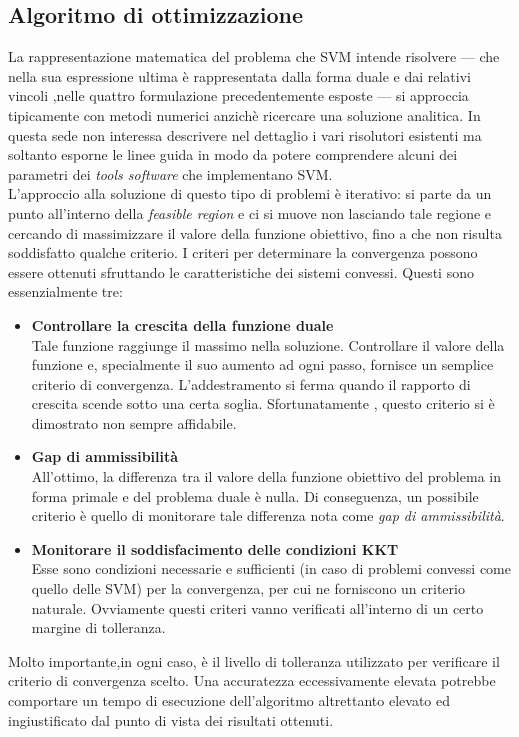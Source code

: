  \subsection{Algoritmo di ottimizzazione}
 La rappresentazione matematica del problema che \ac{SVM} intende risolvere --- che nella sua espressione ultima è rappresentata dalla forma duale e dai relativi vincoli ,nelle quattro formulazione precedentemente esposte  --- si approccia tipicamente con metodi numerici anzichè ricercare una soluzione analitica. In questa sede non interessa descrivere nel dettaglio i vari risolutori esistenti ma soltanto esporne le linee guida in modo da potere comprendere alcuni dei parametri dei \textit{tools software} che implementano \ac{SVM}. \\
 L'approccio alla soluzione di questo tipo di problemi è iterativo: si parte da un punto all'interno della \textit{feasible region} e ci si muove non lasciando tale regione e cercando di massimizzare il valore della funzione obiettivo, fino a che non risulta soddisfatto qualche criterio. I criteri per determinare la convergenza  possono essere ottenuti sfruttando le caratteristiche dei sistemi convessi. Questi sono essenzialmente tre:
 \begin{itemize}
 \item \textbf{Controllare la crescita della funzione duale}\\Tale funzione raggiunge il massimo nella soluzione. Controllare il valore della funzione e, specialmente il suo aumento ad ogni passo, fornisce un semplice criterio di convergenza. L'addestramento si ferma quando il rapporto di crescita scende sotto una certa soglia. Sfortunatamente , questo criterio si è dimostrato non sempre affidabile.
 \item \textbf{Gap di ammissibilità}\\All'ottimo, la differenza tra il valore della funzione obiettivo del problema in forma primale e del problema duale è nulla. Di conseguenza, un possibile criterio è quello di monitorare tale differenza nota come \textit{gap di ammissibilità}.
 \item \textbf{Monitorare il soddisfacimento delle condizioni KKT}\\Esse sono condizioni necessarie e sufficienti (in caso di problemi convessi come quello delle \ac{SVM}) per la convergenza, per cui ne forniscono un criterio naturale.
 Ovviamente questi criteri vanno verificati all'interno di un certo margine di tolleranza.
 \end{itemize}
 Molto importante,in ogni caso, è il livello di tolleranza utilizzato per verificare il criterio di convergenza scelto. Una accuratezza eccessivamente elevata potrebbe comportare un tempo di esecuzione dell'algoritmo altrettanto elevato ed ingiustificato dal punto di vista dei risultati ottenuti.
 
